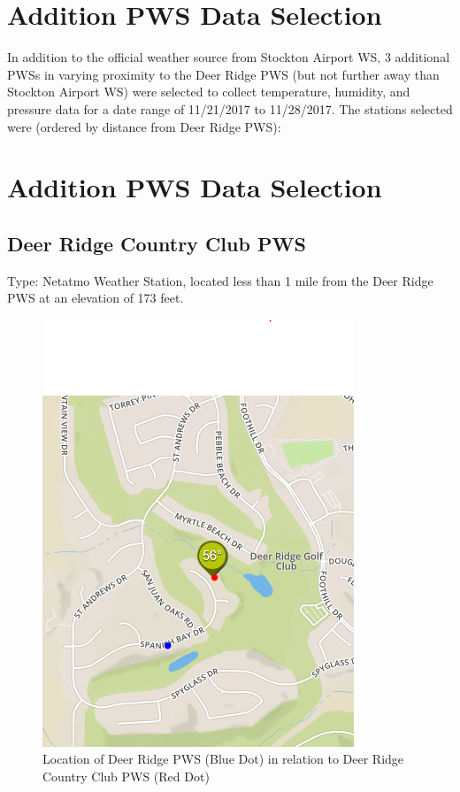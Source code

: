 \documentclass[sigconf]{acmart}
\begin{document}
\section{Addition PWS Data Selection}

In addition to the official weather source from Stockton Airport WS, 3 additional PWSs in varying proximity to the Deer Ridge PWS (but not further away than Stockton Airport WS) were selected to collect temperature, humidity, and pressure data for a date range of 11/21/2017 to 11/28/2017. The stations selected were (ordered by distance from Deer Ridge PWS):

\section{Addition PWS Data Selection} 

\subsection{Deer Ridge Country Club PWS}

Type: Netatmo Weather Station, located less than 1 mile from the Deer Ridge PWS at an elevation of 173 feet.

\begin{figure}[H]
    \centering
    \includegraphics[scale=.40]{DR_DRCC.PNG}
    \caption{Location of Deer Ridge PWS (Blue Dot) in relation to Deer Ridge Country Club PWS (Red Dot)}
\end{figure}
\end{document}
